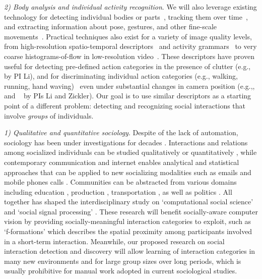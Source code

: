\emph{2) Body analysis and individual activity recognition}. We will also leverage existing technology for detecting individual bodies or  parts~\cite{Dalal:HOG,poselet,pose_part}, tracking them over time~\cite{RamananFZ07,EshelM10}, and extracting information about pose, gestures, and other fine-scale movements~\cite{Mitra:gesture,Ryoo:action,Poppe}. Practical techniques also exist for a variety of image quality levels, from high-resolution spatio-temporal descriptors~\cite{Dollar:STIP,Laptev:STIP,Brox:flow} and activity grammars~\cite{Niebles2007,Niebles2006} to very coarse histograms-of-flow in low-resolution video~\cite{EfrosBMM03}. These descriptors have proven useful for detecting pre-defined action categories in the presence of clutter (e.g.,~\cite{Li2010} by PI Li), and for discriminating individual action categories (e.g., walking, running, hand waving)~\cite{Weizmann,KTH} even under substantial changes in camera position (e.g.,\cite{Weinland:invariance2}, and ~\cite{LiZickler2012} by PIs Li and Zickler). Our goal is to use similar descriptors as a starting point of a different problem: detecting and recognizing social interactions that involve \emph{groups} of individuals. 





\emph{1) Qualitative and quantitative sociology}. Despite of the lack of automation, sociology has been under investigations for decades \cite{Darwin,Thomkins,Goffman,Kendon1990,Ekman,Hoyle,Tannen}. Interactions and relations among socialized individuals can be studied qualitatively or quantitatively \cite{Goodwin2000,Goldin,Goodwin2007,Kendon2010}, while contemporary communication and internet enables analytical and statistical approaches that can be applied to new socializing modalities such as emails \cite{Eckmann} and mobile phones calls \cite{Onnela,Eagle}. Communities can be abstracted from various domains including education \cite{Scherr2009}, production \cite{Watts}, transportation \cite{Gonzalez},  as well as politics \cite{Iacus}. All together has shaped the interdisciplinary study on `computational social science' \cite{Lazer2009} and `social signal processing' \cite{Pantic}. These research will benefit socially-aware computer vision by providing socially-meaningful interaction categories to exploit, such as `f-formations' \cite{Kendon1990} which describes the spatial proximity among participants involved in a short-term interaction. Meanwhile, our proposed research on social interaction detection and discovery will allow learning of interaction categories in many new environments and for large group sizes over long periods, which is usually prohibitive for manual work adopted in current sociological studies.


